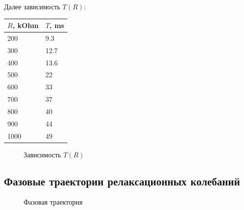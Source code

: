 \documentclass[a4paper,12pt]{article}
\begin{document}
Далее зависимость $T(R)$:
\begin{table}[h]
\centering
\begin{tabular}{|l|l|}
\hline
$R$, kOhm & $T$, ms     \\ \hline
 200 &   9.3  \\ \hline
 300 &  12.7   \\ \hline
 400 &  13.6  \\ \hline
 500 &  22   \\ \hline
 600 &   33  \\ \hline
 700 &   37  \\ \hline
 800 &  40   \\ \hline
 900 &  44   \\ \hline
 1000 &   49  \\ \hline
\end{tabular}
\end{table}
\begin{figure}[h]
\caption{Зависимость $T(R)$}
\label{fig:relation3}
\end{figure}
\subsection*{Фазовые траектории релаксационных колебаний}
\begin{figure}[h]
\caption{Фазовая траектория}
\label{fig:phtrajectory3}
\end{figure}
\newpage
\end{document}
